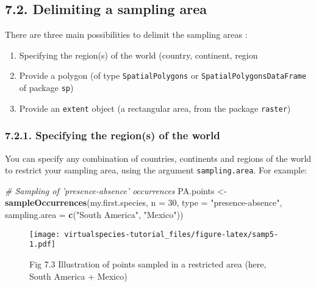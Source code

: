 \documentclass[]{article}
\newenvironment{Shaded}{\begin{snugshade}}{\end{snugshade}}
\newcommand{\KeywordTok}[1]{\textcolor[rgb]{0.13,0.29,0.53}{\textbf{#1}}}
\newcommand{\DataTypeTok}[1]{\textcolor[rgb]{0.13,0.29,0.53}{#1}}
\newcommand{\DecValTok}[1]{\textcolor[rgb]{0.00,0.00,0.81}{#1}}
\newcommand{\StringTok}[1]{\textcolor[rgb]{0.31,0.60,0.02}{#1}}
\newcommand{\CommentTok}[1]{\textcolor[rgb]{0.56,0.35,0.01}{\textit{#1}}}
\newcommand{\NormalTok}[1]{#1}
\providecommand{\tightlist}{%
  \setlength{\itemsep}{0pt}\setlength{\parskip}{0pt}}
\begin{document}
\subsection{7.2. Delimiting a sampling
area}\label{delimiting-a-sampling-area}

There are three main possibilities to delimit the sampling areas :

\begin{enumerate}
\def\labelenumi{\arabic{enumi}.}
\tightlist
\item
  Specifying the region(s) of the world (country, continent, region
\item
  Provide a polygon (of type \texttt{SpatialPolygons} or
  \texttt{SpatialPolygonsDataFrame} of package \texttt{sp})
\item
  Provide an \texttt{extent} object (a rectangular area, from the
  package \texttt{raster})
\end{enumerate}

\subsubsection{7.2.1. Specifying the region(s) of the
world}\label{specifying-the-regions-of-the-world}

You can specify any combination of countries, continents and regions of
the world to restrict your sampling area, using the argument
\texttt{sampling.area}. For example:

\begin{Shaded}
\begin{Highlighting}[]
\CommentTok{# Sampling of 'presence-absence' occurrences}
\NormalTok{PA.points <-}\StringTok{ }\KeywordTok{sampleOccurrences}\NormalTok{(my.first.species,}
                               \DataTypeTok{n =} \DecValTok{30}\NormalTok{,}
                               \DataTypeTok{type =} \StringTok{"presence-absence"}\NormalTok{,}
                               \DataTypeTok{sampling.area =} \KeywordTok{c}\NormalTok{(}\StringTok{"South America"}\NormalTok{, }\StringTok{"Mexico"}\NormalTok{))}
\end{Highlighting}
\end{Shaded}

\begin{figure}
\centering
\texttt{[image: virtualspecies-tutorial\_files/figure-latex/samp5-1.pdf]}
\caption{Fig 7.3 Illustration of points sampled in a restricted area
(here, South America + Mexico)}
\end{figure}
\end{document}
